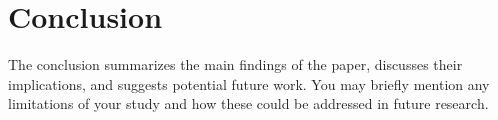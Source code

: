 \section{Conclusion}

The conclusion summarizes the main findings of the paper, discusses their implications, and suggests potential future work. You may briefly mention any limitations of your study and how these could be addressed in future research.

